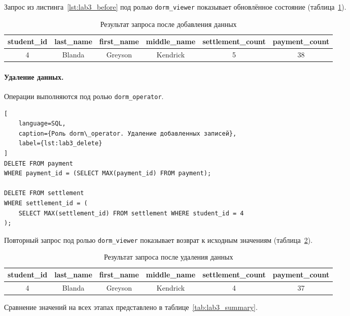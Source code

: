 Запрос из листинга~\ref{lst:lab3_before} под ролью \texttt{dorm\_viewer} показывает обновлённое состояние (таблица~\ref{tab:lab3_after_insert}).

\begin{table}[H]
\centering
\caption{Результат запроса после добавления данных}
\label{tab:lab3_after_insert}
\small
\begin{tabular}{|c|c|c|c|c|c|}
\hline
\textbf{student\_id} & \textbf{last\_name} & \textbf{first\_name} & \textbf{middle\_name} & \textbf{settlement\_count} & \textbf{payment\_count} \\ \hline
4 & Blanda & Greyson & Kendrick & 5 & 38 \\ \hline
\end{tabular}
\end{table}

\paragraph{Удаление данных.} Операции выполняются под ролью \texttt{dorm\_operator}.

\begin{lstlisting}[
    language=SQL,
    caption={Роль dorm\_operator. Удаление добавленных записей},
    label={lst:lab3_delete}
]
DELETE FROM payment
WHERE payment_id = (SELECT MAX(payment_id) FROM payment);

DELETE FROM settlement
WHERE settlement_id = (
    SELECT MAX(settlement_id) FROM settlement WHERE student_id = 4
);
\end{lstlisting}

Повторный запрос под ролью \texttt{dorm\_viewer} показывает возврат к исходным значениям (таблица~\ref{tab:lab3_after_delete}).

\begin{table}[H]
\centering
\caption{Результат запроса после удаления данных}
\label{tab:lab3_after_delete}
\small
\begin{tabular}{|c|c|c|c|c|c|}
\hline
\textbf{student\_id} & \textbf{last\_name} & \textbf{first\_name} & \textbf{middle\_name} & \textbf{settlement\_count} & \textbf{payment\_count} \\ \hline
4 & Blanda & Greyson & Kendrick & 4 & 37 \\ \hline
\end{tabular}
\end{table}

Сравнение значений на всех этапах представлено в таблице~\ref{tab:lab3_summary}.

